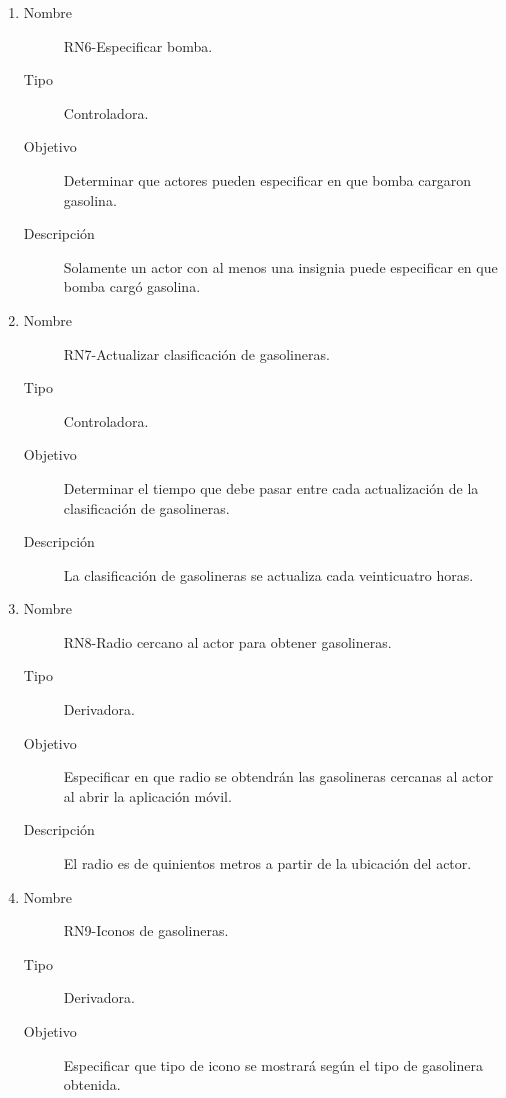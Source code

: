 \begin{enumerate}[label=RN\arabic*.]
\begin{description}
		\end{description}
	\item \label{RN6}
		\begin{description}
			\item[Nombre] RN6-Especificar bomba.
			\item[Tipo] Controladora.
			\item[Objetivo] Determinar que actores pueden especificar en que bomba cargaron gasolina.
			\item[Descripción] Solamente un actor con al menos una insignia puede especificar en que bomba cargó gasolina.
		\end{description}
	\item \label{RN7}
		\begin{description}
			\item[Nombre] RN7-Actualizar clasificación de gasolineras.
			\item[Tipo] Controladora.
			\item[Objetivo] Determinar el tiempo que debe pasar entre cada actualización de la clasificación de gasolineras.
			\item[Descripción] La clasificación de gasolineras se actualiza cada veinticuatro horas.
		\end{description}
	\item \label{RN8}
		\begin{description}
			\item[Nombre] RN8-Radio cercano al actor para obtener gasolineras.
			\item[Tipo] Derivadora.
			\item[Objetivo] Especificar en que radio se obtendrán las gasolineras cercanas al actor al abrir la aplicación móvil.
			\item[Descripción] El radio es de quinientos metros a partir de la ubicación del actor.
		\end{description}
	\item \label{RN9}
		\begin{description}
			\item[Nombre] RN9-Iconos de gasolineras.
			\item[Tipo] Derivadora.
			\item[Objetivo] Especificar que tipo de icono se mostrará según el tipo de gasolinera obtenida.

\end{description}
\end{enumerate}
